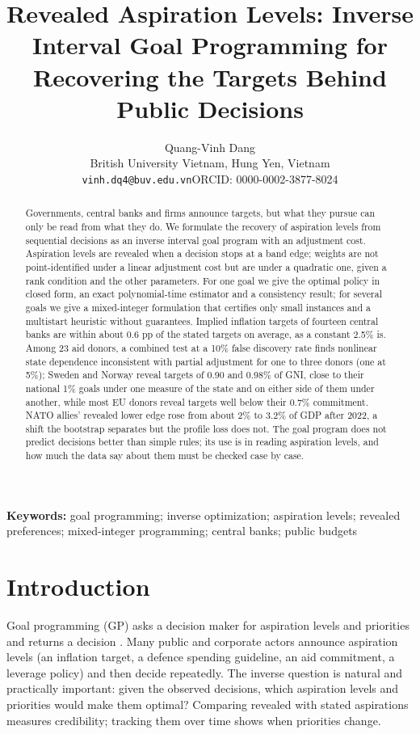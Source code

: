 \documentclass[11pt,a4paper]{article}
\title{Revealed Aspiration Levels: Inverse Interval Goal Programming for Recovering the Targets Behind Public Decisions}
\author{Quang-Vinh Dang\\British University Vietnam, Hung Yen, Vietnam\\\texttt{vinh.dq4@buv.edu.vn}\quad ORCID: 0000-0002-3877-8024}
\date{}
\theoremstyle{remark}\newtheorem{remark}{Remark}
\begin{document}
\maketitle

\begin{abstract}
Governments, central banks and firms announce targets, but what they pursue can only be read from what they do. We formulate the recovery of aspiration levels from sequential decisions as an inverse interval goal program with an adjustment cost. Aspiration levels are revealed when a decision stops at a band edge; weights are not point-identified under a linear adjustment cost but are under a quadratic one, given a rank condition and the other parameters. For one goal we give the optimal policy in closed form, an exact polynomial-time estimator and a consistency result; for several goals we give a mixed-integer formulation that certifies only small instances and a multistart heuristic without guarantees. Implied inflation targets of fourteen central banks are within about 0.6 pp of the stated targets on average, as a constant 2.5\% is. Among 23 aid donors, a combined test at a 10\% false discovery rate finds nonlinear state dependence inconsistent with partial adjustment for one to three donors (one at 5\%); Sweden and Norway reveal targets of 0.90 and 0.98\% of GNI, close to their national 1\% goals under one measure of the state and on either side of them under another, while most EU donors reveal targets well below their 0.7\% commitment. NATO allies' revealed lower edge rose from about 2\% to 3.2\% of GDP after 2022, a shift the bootstrap separates but the profile loss does not. The goal program does not predict decisions better than simple rules; its use is in reading aspiration levels, and how much the data say about them must be checked case by case.
\end{abstract}

\noindent\textbf{Keywords:} goal programming; inverse optimization; aspiration levels; revealed preferences; mixed-integer programming; central banks; public budgets

\section{Introduction}
Goal programming (GP) asks a decision maker for aspiration levels and priorities and returns a decision \citep{charnes1961,ignizio1976,tamiz1998,jones2010}. Many public and corporate actors announce aspiration levels (an inflation target, a defence spending guideline, an aid commitment, a leverage policy) and then decide repeatedly. The inverse question is natural and practically important: given the observed decisions, which aspiration levels and priorities would make them optimal? Comparing revealed with stated aspirations measures credibility; tracking them over time shows when priorities change.
\end{document}
